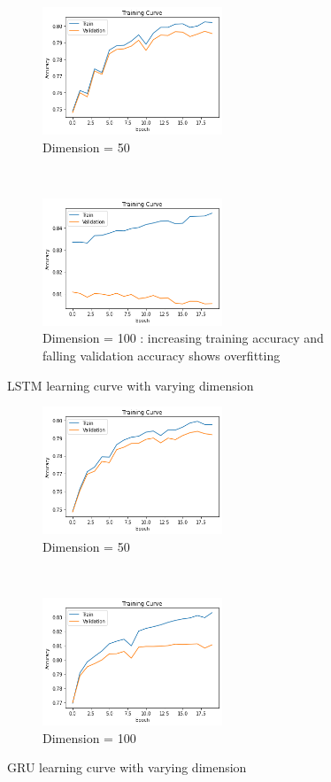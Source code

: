 \documentclass{article}
\begin{document}
\begin{figure}[ht!]
    \centering
    \begin{subfigure}[t]{0.5\textwidth}
        \centering
        \includegraphics[height=1.5in]{img/sa-dim-search/lstm-training-dim50}
        \caption{Dimension = 50}
    \end{subfigure}%
    ~ 
    \begin{subfigure}[t]{0.5\textwidth}
        \centering
        \includegraphics[height=1.5in]{img/sa-dim-search/lstm-training-dim100}
        \caption{Dimension = 100 : increasing training accuracy and falling validation accuracy shows overfitting}
    \end{subfigure}
    \caption{LSTM learning curve with varying dimension}
\end{figure}
\begin{figure}[ht!]
    \centering
    \begin{subfigure}[t]{0.5\textwidth}
        \centering
        \includegraphics[height=1.5in]{img/sa-dim-search/gru-training-dim50}
        \caption{Dimension = 50}
    \end{subfigure}%
    ~ 
    \begin{subfigure}[t]{0.5\textwidth}
        \centering
        \includegraphics[height=1.5in]{img/sa-dim-search/gru-training-dim100}
        \caption{Dimension = 100}
    \end{subfigure}
    \caption{GRU learning curve with varying dimension}
\end{figure}
\end{document}
